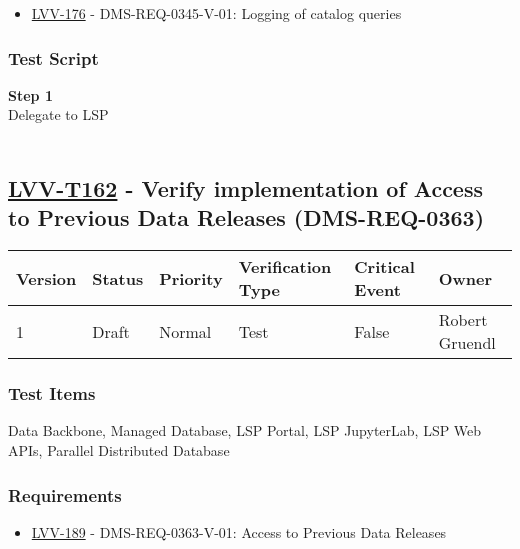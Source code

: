 \begin{itemize}
\tightlist
\item
  \href{https://jira.lsstcorp.org/browse/LVV-176}{LVV-176} -
  DMS-REQ-0345-V-01: Logging of catalog queries
\end{itemize}

\hypertarget{test-script-138}{%
\subsubsection{Test Script}\label{test-script-138}}

\textbf{Step 1}\\
Delegate to LSP\\
~\\

\hypertarget{lvv-t162---verify-implementation-of-access-to-previous-data-releases-dms-req-0363}{%
\subsection{\texorpdfstring{\href{https://jira.lsstcorp.org/secure/Tests.jspa\#/testCase/LVV-T162}{LVV-T162}
- Verify implementation of Access to Previous Data Releases
(DMS-REQ-0363)}{LVV-T162 - Verify implementation of Access to Previous Data Releases (DMS-REQ-0363)}}\label{lvv-t162---verify-implementation-of-access-to-previous-data-releases-dms-req-0363}}

\begin{longtable}[]{@{}llllll@{}}
\toprule
Version & Status & Priority & Verification Type & Critical Event &
Owner\tabularnewline
\midrule
\endhead
1 & Draft & Normal & Test & False & Robert Gruendl\tabularnewline
\bottomrule
\end{longtable}

\hypertarget{test-items-138}{%
\subsubsection{Test Items}\label{test-items-138}}

Data Backbone, Managed Database, LSP Portal, LSP JupyterLab, LSP Web
APIs, Parallel Distributed Database

\hypertarget{requirements-139}{%
\subsubsection{Requirements}\label{requirements-139}}

\begin{itemize}
\tightlist
\item
  \href{https://jira.lsstcorp.org/browse/LVV-189}{LVV-189} -
  DMS-REQ-0363-V-01: Access to Previous Data Releases
\end{itemize}


